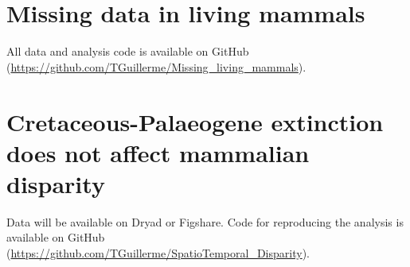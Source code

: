 \documentclass[12pt]{mythesis} %
\begin{document}
\section*{Missing data in living mammals}
All data and analysis code is available on GitHub (\url{https://github.com/TGuillerme/Missing_living_mammals}).

\section*{Cretaceous-Palaeogene extinction does not affect mammalian disparity}
Data will be available on Dryad or Figshare.
Code for reproducing the analysis is available on GitHub (\url{https://github.com/TGuillerme/SpatioTemporal_Disparity}).


\newpage

\mainbody

 

   
	



\formatbibliography 
 


\formatappendices


\end{document}
